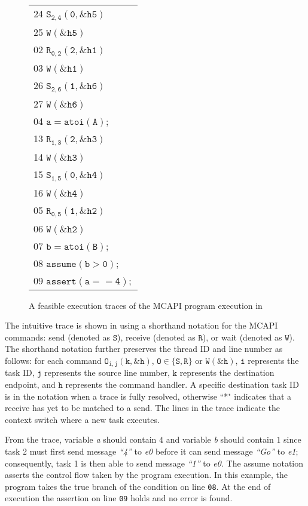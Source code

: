 \begin{figure}[b]
\begin{center}
\setlength{\tabcolsep}{2pt}
\scriptsize \begin{tabular}[t]{l}
24 $\mathtt{S_{2,4}(0,\&h5)}$ \\
25 $\mathtt{W(\&h5)}$\\
\hline
02 $\mathtt{R_{0,2}(2,\&h1)}$ \\
03 $\mathtt{W(\&h1)}$ \\
\hline
26 $\mathtt{S_{2,6}(1,\&h6)}$ \\
27 $\mathtt{W(\&h6)}$ \\
\hline
04 $\mathtt{a = atoi(A);}$ \\
\hline
13 $\mathtt{R_{1,3}(2,\&h3)}$ \\
14 $\mathtt{W(\&h3)}$ \\
15 $\mathtt{S_{1,5}(0,\&h4)}$ \\
16 $\mathtt{W(\&h4)}$ \\
\hline
05 $\mathtt{R_{0,5}(1,\&h2)}$ \\
06 $\mathtt{W(\&h2)}$ \\
07 $\mathtt{b = atoi(B);}$ \\
08 $\mathtt{assume (b > 0);}$ \\
09 $\mathtt{assert(a == 4);}$ \\
\end{tabular}
\end{center}
\caption{A feasible  execution traces of the MCAPI program execution in }
\label{fig:trace1}
\end{figure}

The intuitive trace is shown in  using a shorthand
notation for the MCAPI commands: send (denoted as $\mathtt{S}$),
receive (denoted as $\mathtt{R}$), or wait (denoted as $\mathtt{W}$).
The shorthand notation further preserves the thread ID and line number
as follows: for each command $\mathtt{O_{i,j}(k,\&h)}$, $\mathtt{O \in
  \{S,R\}}$ or $\mathtt{W(\&h)}$, $\mathtt{i}$ represents the task ID,
$\mathtt{j}$ represents the source line number, $\mathtt{k}$
represents the destination endpoint, and $\mathtt{h}$ represents the
command handler. A specific destination task ID is in the
notation when a trace is fully resolved, otherwise ``*" 
indicates that a receive has yet to be matched to a send. The
lines in the trace indicate the context switch where a new task
executes.

From the trace, variable \textit{a} should contain $4$ and variable
\textit{b} should contain $1$ since task 2 must first send message
\textit{``4''} to \textit{e0} before it can send message
\textit{``Go''} to \textit{e1}; consequently, task 1 is then able to
send message \textit{``1''} to \textit{e0}. The assume notation
asserts the control flow taken by the program execution. In this
example, the program takes the true branch of the condition on line
\texttt{08}.  At the end of execution the assertion on line
\texttt{09} holds and no error is found.

